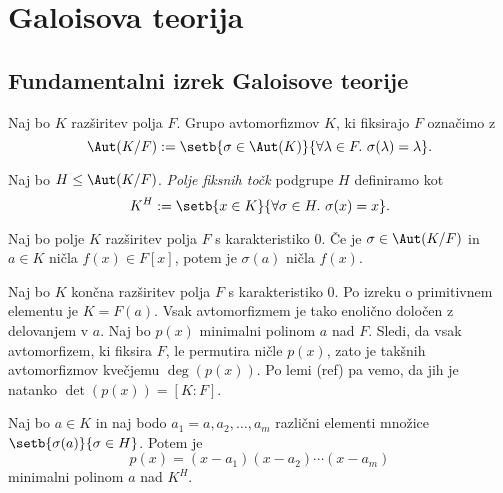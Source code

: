 \section{Galoisova teorija}
\subsection{Fundamentalni izrek Galoisove teorije}


\begin{definicija}
    Naj bo $K$ razširitev polja $F$. Grupo avtomorfizmov $K$, ki fiksirajo $F$ označimo z 
    \[
        \Aut(K/F) := \setb{\sigma \in \Aut(K)}{\forall \lambda \in F.~\sigma(\lambda) = \lambda}.
    \]
\end{definicija}

\begin{definicija}
    Naj bo $H \le \Aut(K/F)$. \emph{Polje fiksnih točk} podgrupe $H$ definiramo kot
    \[
        K^H := \setb{x \in K}{\forall \sigma \in H.~\sigma(x)=x}.
    \]
\end{definicija}

\begin{lema}
    Naj bo polje $K$ razširitev polja $F$ s karakteristiko $0$.
    Če je $\sigma \in \Aut(K/F)$ in $a \in K$ ničla $f(x) \in F[x]$, potem je 
    $\sigma(a)$ ničla $f(x)$. 
\end{lema}

%    

\begin{opomba}
    Naj bo $K$ končna razširitev polja $F$ s karakteristiko $0$. Po izreku o 
    primitivnem elementu je $K = F(a)$. Vsak avtomorfizmem je tako enolično 
    določen z delovanjem v $a$. Naj bo $p(x)$ minimalni polinom $a$ nad $F$. 
    Sledi, da vsak avtomorfizem, ki fiksira $F$, le permutira ničle $p(x)$, 
    zato je takšnih avtomorfizmov kvečjemu $\deg(p(x))$. Po lemi (ref) %
    pa vemo, da jih je natanko $\det(p(x)) = [K:F]$.
\end{opomba}

\begin{lema}
    Naj bo $a \in K$ in naj bodo $a_1=a, a_2, \dots, a_m$ različni
    elementi množice $\setb{\sigma(a)}{\sigma \in H}$. Potem je 
    \[
        p(x) = (x - a_1) (x - a_2) \cdots (x - a_m)
    \]
    minimalni polinom $a$ nad $K^H$.
\end{lema}

